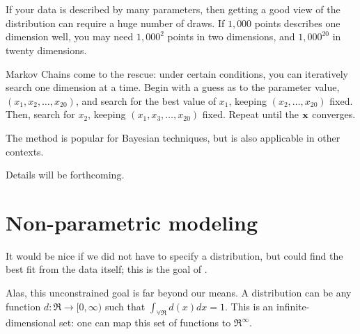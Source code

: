 
\section{} If your data is described by
many parameters, then getting a good view of the distribution can require
a huge number of draws. If $1,000$ points describes one dimension well,
you may need $1,000^2$ points in two dimensions, and $1,000^{20}$ in
twenty dimensions. 

Markov Chains come to the rescue: under certain conditions, you can
iteratively search one dimension at a time. Begin with a guess as to
the parameter value, $(x_1, x_2, \dots, x_{20})$, and search for the
best value of $x_1$, keeping
$(x_2, \dots, x_{20})$ fixed. Then, search for $x_2$, keeping
$(x_1, x_3,  \dots, x_{20})$ fixed. Repeat until the ${\bf x}$ converges.

The method is popular for Bayesian techniques, but is also applicable in
other contexts.

Details will be forthcoming.



\section{Non-parametric modeling} It would be nice if we did not
have to specify a distribution, but could find the best fit from the
data itself; this is the goal of . 

Alas, this unconstrained goal is far beyond our means.
A distribution can be any function $d:\Re \to [0,\infty)$ such that
$\int_{\forall \Re} d(x) dx = 1$. This is an infinite-dimensional set:
one can map this set of functions to $\Re^\infty$.

